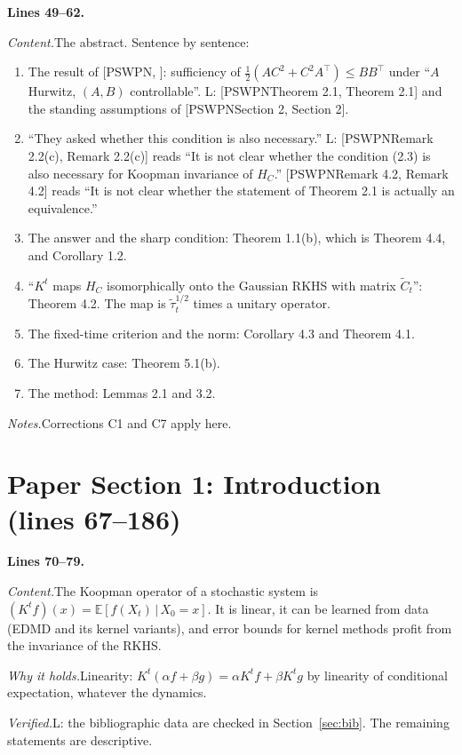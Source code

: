 \documentclass[11pt]{amsart}
\newcommand{\Ct}{\widetilde{C}_t}
\newcommand{\taut}{\widetilde{\tau}_t}
\newcommand{\tp}{\top}
\newcommand{\src}[1]{\par\bigskip\noindent\textbf{Lines #1.}\enspace}
\newcommand{\content}{\par\smallskip\noindent\textit{Content.}\enspace}
\newcommand{\why}{\par\smallskip\noindent\textit{Why it holds.}\enspace}
\newcommand{\verified}{\par\smallskip\noindent\textit{Verified.}\enspace}
\newcommand{\notes}{\par\smallskip\noindent\textit{Notes.}\enspace}
\newcommand{\tL}{\textsf{L}}
\newcommand{\PS}[1][]{[PSWPN\ifx\relax#1\relax\else, #1\fi]}
\begin{document}
\src{49--62}
\content The abstract. Sentence by sentence:
\begin{enumerate}
\item The result of \PS: sufficiency of $\frac12(AC^2+C^2A^\tp)\le BB^\tp$ under ``$A$ Hurwitz, $(A,B)$
controllable''. \tL: \PS[Theorem 2.1] and the standing assumptions of \PS[Section 2].
\item ``They asked whether this condition is also necessary.'' \tL: \PS[Remark 2.2(c)] reads ``It is not clear whether
the condition (2.3) is also necessary for Koopman invariance of $H_C$.'' \PS[Remark 4.2] reads ``It is not clear
whether the statement of Theorem 2.1 is actually an equivalence.''
\item The answer and the sharp condition: Theorem 1.1(b), which is Theorem 4.4, and Corollary 1.2.
\item ``$K^t$ maps $H_C$ isomorphically onto the Gaussian RKHS with matrix $\Ct$'': Theorem 4.2. The map is
$\taut^{1/2}$ times a unitary operator.
\item The fixed-time criterion and the norm: Corollary 4.3 and Theorem 4.1.
\item The Hurwitz case: Theorem 5.1(b).
\item The method: Lemmas 2.1 and 3.2.
\end{enumerate}
\notes Corrections C1 and C7 apply here.

\section{Paper Section 1: Introduction (lines 67--186)}\label{sec:intro}

\src{70--79}
\content The Koopman operator of a stochastic system is $(K^tf)(x)=\mathbb E[f(X_t)\,|\,X_0=x]$. It is linear, it can
be learned from data (EDMD and its kernel variants), and error bounds for kernel methods profit from the invariance of
the RKHS.
\why Linearity: $K^t(\alpha f+\beta g)=\alpha K^tf+\beta K^tg$ by linearity of conditional expectation, whatever the
dynamics.
\verified \tL: the bibliographic data are checked in Section~\ref{sec:bib}. The remaining statements are descriptive.
\end{document}
